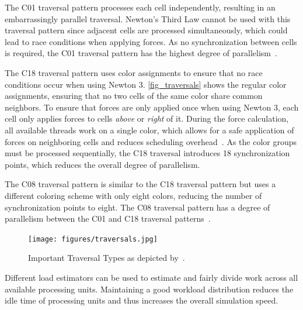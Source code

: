 \documentclass[conference]{IEEEtran}
\begin{document}
\begin{description}[style=nextline]
        \begin{description}[style=nextline, font=\itshape\mdseries]
            \item[$\bullet$ C01]
                The C01 traversal pattern processes each cell independently, resulting in an embarrassingly parallel traversal. Newton's Third Law cannot be used with this traversal pattern since adjacent cells are processed simultaneously, which could lead to race conditions when applying forces. As no synchronization between cells is required, the C01 traversal pattern has the highest degree of parallelism~\cite{NEWCOME2023115278}.
            \item[$\bullet$ C18]
                The C18 traversal pattern uses color assignments to ensure that no race conditions occur when using Newton 3. \autoref{fig_traversals} shows the regular color assignments, ensuring that no two cells of the same color share common neighbors. To ensure that forces are only applied once when using Newton 3, each cell only applies forces to cells \textit{above} or \textit{right} of it. During the force calculation, all available threads work on a single color, which allows for a safe application of forces on neighboring cells and reduces scheduling overhead~\cite{NEWCOME2023115278}. As the color groups must be processed sequentially, the C18 traversal introduces 18 synchronization points, which reduces the overall degree of parallelism\cite{NEWCOME2023115278}.

            \item[$\bullet$ C08]
                The C08 traversal pattern is similar to the C18 traversal pattern but uses a different coloring scheme with only eight colors, reducing the number of synchronization points to eight. The C08 traversal pattern has a degree of parallelism between the C01 and C18 traversal patterns~\cite{NEWCOME2023115278}.
        \end{description}

        \begin{figure}[H]
            \centering
            \texttt{[image: figures/traversals.jpg]}
            \caption{Important Traversal Types as depicted by~\cite{NEWCOME2023115278}.}
            \label{fig_traversals}
        \end{figure}

    \item[Load Estimator]
        Different load estimators can be used to estimate and fairly divide work across all available processing units. Maintaining a good workload distribution reduces the idle time of processing units and thus increases the overall simulation speed.


\end{description}
\end{document}
